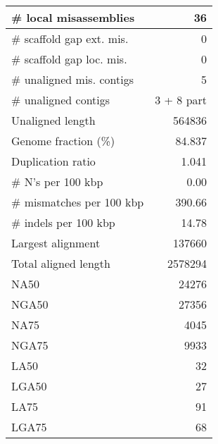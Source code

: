 \documentclass[12pt,a4paper]{article}
\begin{document}
\begin{table}[ht]
\begin{center}
\begin{tabular}{|l*{1}{|r}|}
\# local misassemblies & 36 \\ \hline
\# scaffold gap ext. mis. & 0 \\ \hline
\# scaffold gap loc. mis. & 0 \\ \hline
\# unaligned mis. contigs & 5 \\ \hline
\# unaligned contigs & 3 + 8 part \\ \hline
Unaligned length & 564836 \\ \hline
Genome fraction (\%) & 84.837 \\ \hline
Duplication ratio & 1.041 \\ \hline
\# N's per 100 kbp & 0.00 \\ \hline
\# mismatches per 100 kbp & 390.66 \\ \hline
\# indels per 100 kbp & 14.78 \\ \hline
Largest alignment & 137660 \\ \hline
Total aligned length & 2578294 \\ \hline
NA50 & 24276 \\ \hline
NGA50 & 27356 \\ \hline
NA75 & 4045 \\ \hline
NGA75 & 9933 \\ \hline
LA50 & 32 \\ \hline
LGA50 & 27 \\ \hline
LA75 & 91 \\ \hline
LGA75 & 68 \\ \hline
\end{tabular}
\end{center}
\end{table}
\end{document}
